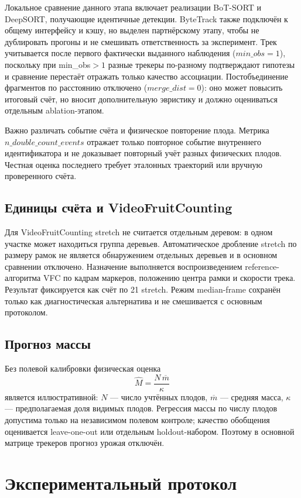 \documentclass[12pt,a4paper]{article}
\newcommand{\avg}{\overline}
\begin{document}
Локальное сравнение данного этапа включает реализации BoT-SORT и DeepSORT,
получающие идентичные детекции. ByteTrack также подключён к общему
интерфейсу и кэшу, но выделен партнёрскому этапу, чтобы не дублировать
прогоны и не смешивать ответственность за эксперимент. Трек учитывается
после первого фактически выданного наблюдения ($min\_obs=1$), поскольку
при min\_obs$>1$ разные трекеры по-разному подтверждают гипотезы и сравнение
перестаёт отражать только качество ассоциации. Постобъединение фрагментов
по расстоянию отключено ($merge\_dist=0$): оно может повысить итоговый
счёт, но вносит дополнительную эвристику и должно оцениваться отдельным
ablation-этапом.

Важно различать событие счёта и физическое повторение плода. Метрика
$n\_double\_count\_events$ отражает только повторное событие внутреннего
идентификатора и не доказывает повторный учёт разных физических плодов.
Честная оценка последнего требует эталонных траекторий или вручную
проверенного счёта.

\subsection{Единицы счёта и VideoFruitCounting}

Для VideoFruitCounting stretch не считается отдельным деревом: в одном
участке может находиться группа деревьев. Автоматическое дробление stretch
по размеру рамок не является обнаружением отдельных деревьев и в основном
сравнении отключено. Назначение выполняется воспроизведением reference-алго\-ритма VFC по кадрам маркеров, положению центра рамки и скорости
трека. Результат фиксируется как счёт по 21 stretch. Режим median-frame
сохранён только как диагностическая альтернатива и не смешивается с
основным протоколом.

\subsection{Прогноз массы}

Без полевой калибровки физическая оценка
\[
  \hat M = \frac{N\,\avg m}{\kappa}
\]
является иллюстративной: $N$ --- число учтённых плодов, $\avg m$ ---
средняя масса, $\kappa$ --- предполагаемая доля видимых плодов. Регрессия
массы по числу плодов допустима только на независимом полевом контроле;
качество обобщения оценивается leave-one-out или отдельным holdout-набором.
Поэтому в основной матрице трекеров прогноз урожая отключён.

\section{Экспериментальный протокол}
\end{document}
